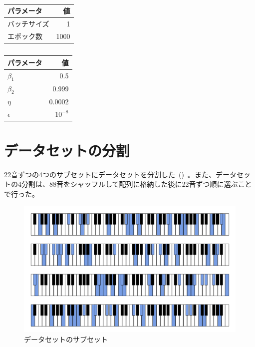 \begin{table}[h]
\centering
\begin{minipage}[b]{0.49\columnwidth}
    \centering
        \begin{tabular}{lr}\toprule
            パラメータ & 値 \\ \midrule
            バッチサイズ & 1 \\ 
            エポック数 & 1000 \\ \bottomrule
        \end{tabular}
    \caption{}
    \label{tab:params1}
\end{minipage}
\begin{minipage}[b]{0.49\columnwidth}
    \centering
        \begin{tabular}{lr}\toprule
            パラメータ & 値 \\ \midrule
            $\beta_1$ & 0.5 \\
            $\beta_2$ & 0.999 \\
            $\eta$ & 0.0002 \\ 
            $\epsilon$ & $10^{-8}$ \\ \bottomrule
        \end{tabular}
    \caption{}
    \label{tab:params2}
\end{minipage}
\end{table}

\chapter{データセットの分割}
\label{app:split}

22音ずつの4つのサブセットにデータセットを分割した~()~。また、データセットの4分割は、88音をシャッフルして配列に格納した後に22音ずつ順に選ぶことで行った。

\begin{figure}[h]
\centering
\includegraphics[width=\columnwidth]{figure/data_div.png}
\caption[]{データセットのサブセット}
\label{fig:data_div}
\end{figure}

